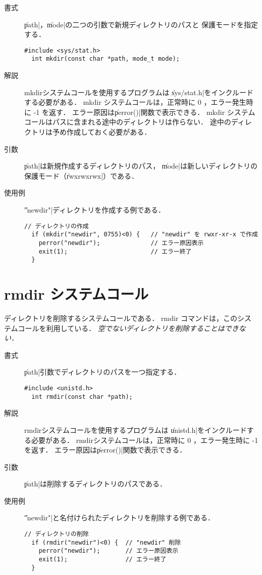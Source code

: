 \begin{description}
\item[書式] \|path|，\|mode|の二つの引数で新規ディレクトリのパスと
保護モードを指定する．
\begin{lstlisting}[numbers=none]
  #include <sys/stat.h>
  int mkdir(const char *path, mode_t mode);
\end{lstlisting}

\item[解説] mkdirシステムコールを使用するプログラムは
\|sys/stat.h|をインクルードする必要がある．
mkdir システムコールは，正常時に 0 ，エラー発生時に -1 を返す．
エラー原因は\|perror()|関数で表示できる．
mkdir システムコールはパスに含まれる途中のディレクトリは作らない．
途中のディレクトリは予め作成しておく必要がある．

\item[引数] \|path|は新規作成するディレクトリのパス，
\|mode|は新しいディレクトリの保護モード（\|rwxrwxrwx|）である．

\item[使用例] \|"newdir"|ディレクトリを作成する例である．
\begin{lstlisting}[numbers=none]
  // ディレクトリの作成
  if (mkdir("newdir", 0755)<0) {   // "newdir" を rwxr-xr-x で作成
    perror("newdir");              // エラー原因表示
    exit(1);                       // エラー終了
  }
\end{lstlisting}
\end{description}

\section{rmdir システムコール}
ディレクトリを削除するシステムコールである．
rmdir コマンドは，このシステムコールを利用している．
\emph{空でないディレクトリを削除することはできない．}

\begin{description}
\item[書式] \|path|引数でディレクトリのパスを一つ指定する．
\begin{lstlisting}[numbers=none]
  #include <unistd.h>
  int rmdir(const char *path);
\end{lstlisting}

\item[解説] rmdirシステムコールを使用するプログラムは
\|unistd.h|をインクルードする必要がある．
rmdirシステムコールは，正常時に 0 ，エラー発生時に -1 を返す．
エラー原因は\|perror()|関数で表示できる．

\item[引数] \|path|は削除するディレクトリのパスである．

\item[使用例] \|"newdir"|と名付けられたディレクトリを削除する例である．
\begin{lstlisting}[numbers=none]
  // ディレクトリの削除
  if (rmdir("newdir")<0) {  // "newdir" 削除
    perror("newdir");       // エラー原因表示
    exit(1);                // エラー終了
  }
\end{lstlisting}
\end{description}

